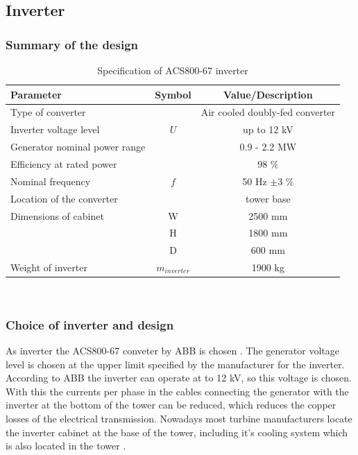 \newpage
\subsection{Inverter}

\subsubsection{Summary of the design}

\begin{table}[h]
\centering
\caption{Specification of ACS800-67 inverter}
\label{tab:}
\begin{tabular}{ |l|c|c|} 
\hline
\textbf{Parameter} & Symbol & \textbf{Value/Description} \\ 
\hline
Type of converter & & Air cooled doubly-fed converter \\
\hline
Inverter voltage level & $U$ & up to 12 kV\\
\hline
Generator nominal power range & & 0.9 - 2.2 MW \\
\hline
Efficiency at rated power & & 98 \% \\ 
\hline
Nominal frequency & $f$ & 50 Hz $\pm 3$ \% \\
\hline
Location of the converter & & tower base  \\ 
\hline
Dimensions of cabinet & W & 2500 mm \\
\hline
& H & 1800 mm \\
\hline
& D & 600 mm \\
\hline
Weight of inverter & $m_{inverter}$ & 1900 kg \\
\hline
\end{tabular} \\
\end{table}


\subsubsection{Choice of inverter and design}

As inverter the ACS800-67 conveter by ABB is chosen \cite{ABB}. The generator voltage level is chosen at the upper limit specified by the manufacturer for the inverter. According to ABB the inverter can operate at to 12 kV, so this voltage is chosen. With this the currents per phase in the cables connecting the generator with the inverter at the bottom of the tower can be reduced, which reduces the copper losses of the electrical transmission. Nowadays most turbine manufacturers locate the inverter cabinet at the base of the tower, including it's cooling system which is also located in the tower \cite{hau}.


